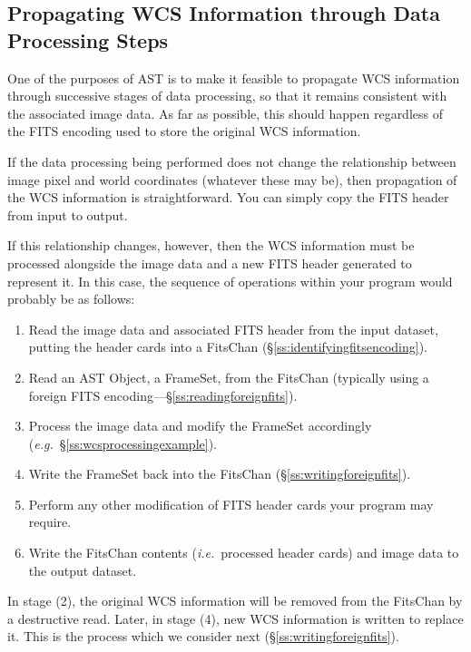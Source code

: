 \documentclass[twoside,11pt]{article}
\newcommand{\secref}[1]{\S\ref{#1}}
\newcommand{\secref}[1]{\ref{#1}}
\begin{document}
\subsection{\label{ss:propagatingwcsinformation}Propagating WCS Information through Data Processing Steps}

One of the purposes of AST is to make it feasible to propagate WCS
information through successive stages of data processing, so that it
remains consistent with the associated image data. As far as possible,
this should happen regardless of the FITS encoding used to store the
original WCS information.

If the data processing being performed does not change the
relationship between image pixel and world coordinates (whatever these
may be), then propagation of the WCS information is
straightforward. You can simply copy the FITS header from input to
output.

If this relationship changes, however, then the WCS information must
be processed alongside the image data and a new FITS header generated
to represent it. In this case, the sequence of operations within your
program would probably be as follows:

\begin{enumerate}
\item Read the image data and associated FITS header from the input
dataset, putting the header cards into a FitsChan
(\secref{ss:identifyingfitsencoding}).

\item Read an AST Object, a FrameSet, from the FitsChan (typically
using a foreign FITS encoding---\secref{ss:readingforeignfits}).

\item Process the image data and modify the FrameSet accordingly
({\em{e.g.}}~\secref{ss:wcsprocessingexample}).

\item Write the FrameSet back into the FitsChan
(\secref{ss:writingforeignfits}).

\item Perform any other modification of FITS header cards your program
may require.

\item Write the FitsChan contents ({\em{i.e.}}\ processed header
cards) and image data to the output dataset.
\end{enumerate}

In stage (2), the original WCS information will be removed from the
FitsChan by a destructive read. Later, in stage (4), new WCS
information is written to replace it. This is the process which we
consider next (\secref{ss:writingforeignfits}).
\end{document}
